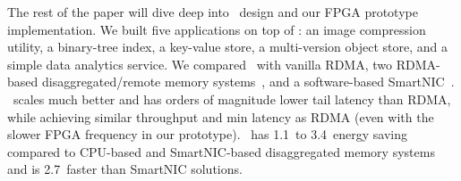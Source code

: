 The rest of the paper will dive deep into \sys\ design and our FPGA prototype implementation.
We built five applications on top of \sys:
an image compression utility, a binary-tree index, a key-value store, a multi-version object store, and a simple data analytics service.
We compared \sys\ with vanilla RDMA, two RDMA-based disaggregated/remote memory systems~\cite{Tsai20-ATC,Kalia14-RDMAKV}, 
and a software-based SmartNIC~\cite{BlueField}.
\sys\ scales much better and has orders of magnitude lower tail latency than RDMA, 
while achieving similar throughput and min latency as RDMA (even with the slower FPGA frequency in our prototype).
\sys\ has 1.1\x\ to 3.4\x\ energy saving compared to CPU-based and SmartNIC-based disaggregated memory systems 
and is 2.7\x\ faster than SmartNIC solutions. 

\fi
